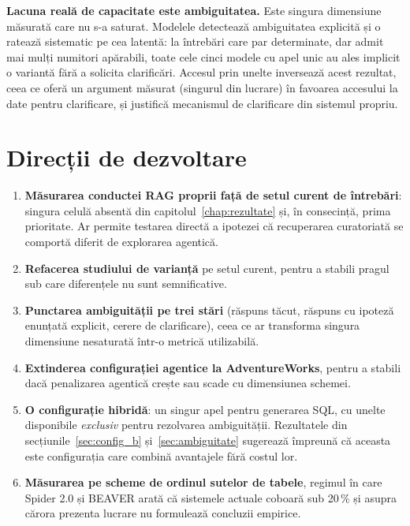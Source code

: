 \documentclass[12pt,a4paper]{report}
\begin{document}
\textbf{Lacuna reală de capacitate este ambiguitatea.} Este singura dimensiune
măsurată care nu s-a saturat. Modelele detectează ambiguitatea explicită și o ratează
sistematic pe cea latentă: la întrebări care par determinate, dar admit mai mulți numitori
apărabili, toate cele cinci modele cu apel unic au ales implicit o variantă fără a solicita
clarificări. Accesul prin unelte inversează acest rezultat, ceea ce
oferă un argument măsurat (singurul din lucrare) în favoarea accesului
la date pentru clarificare, și justifică mecanismul de clarificare din
sistemul propriu.

\section{Direcții de dezvoltare}
\label{sec:directii_dezvoltare}

\begin{enumerate}[nosep,leftmargin=*]
  \item \textbf{Măsurarea conductei RAG proprii față de setul curent de
    întrebări}: singura celulă absentă din capitolul~\ref{chap:rezultate} și, în consecință,
    prima prioritate. Ar permite testarea directă a ipotezei că recuperarea
    curatoriată se comportă diferit de explorarea agentică.
  \item \textbf{Refacerea studiului de varianță} pe setul curent, pentru a
    stabili pragul sub care diferențele nu sunt semnificative.
  \item \textbf{Punctarea ambiguității pe trei stări} (răspuns tăcut, răspuns
    cu ipoteză enunțată explicit, cerere de clarificare), ceea ce ar
    transforma singura dimensiune nesaturată într-o metrică utilizabilă.
  \item \textbf{Extinderea configurației agentice la AdventureWorks}, pentru a
    stabili dacă penalizarea agentică crește sau scade cu dimensiunea schemei.
  \item \textbf{O configurație hibridă}: un singur apel pentru generarea SQL, cu
    unelte disponibile \emph{exclusiv} pentru rezolvarea ambiguității.
    Rezultatele din secțiunile~\ref{sec:config_b} și~\ref{sec:ambiguitate} sugerează împreună că aceasta este configurația
    care combină avantajele fără costul lor.
  \item \textbf{Măsurarea pe scheme de ordinul sutelor de tabele}, regimul în
    care Spider 2.0 \cite{spider2} și BEAVER \cite{beaver} arată că sistemele actuale coboară sub 20\,\% și
    asupra cărora prezenta lucrare nu formulează concluzii empirice.
\end{enumerate}
\end{document}
